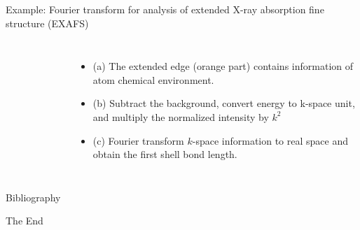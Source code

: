 \documentclass[aspectratio=169]{beamer}
\begin{document}
\begin{frame}{Example: Fourier transform for analysis of extended X-ray absorption fine structure (EXAFS)}
\begin{columns}
\begin{figure}
    \end{figure}
    \begin{itemize}
        \item (a) The extended edge (orange part) contains information of atom chemical environment.
        \item (b) Subtract the background, convert energy to k-space unit, and multiply the normalized intensity by $k^2$
        \item (c) Fourier transform $k$-space information to real space and obtain the first shell bond length. 
    \end{itemize}
    \end{columns}
\end{frame} 


\begin{frame}[allowframebreaks]{Bibliography}
    
    
\end{frame}


\begin{frame}
    \Huge{\centerline{The End}}
\end{frame}
\end{document}
